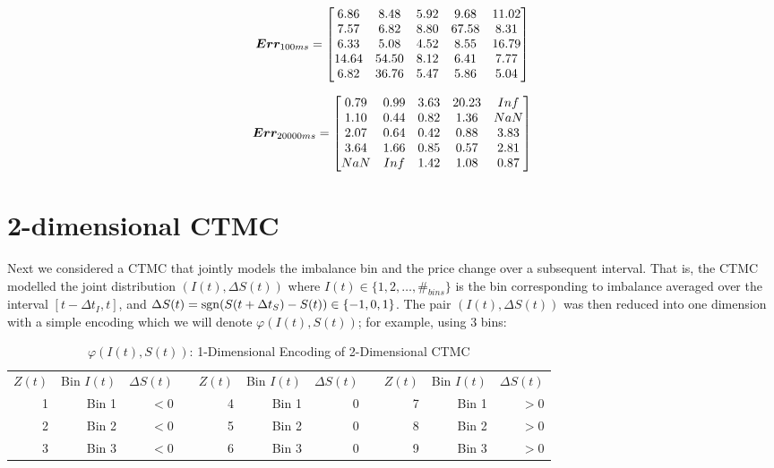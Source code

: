 $$\boldsymbol{Err}_{100ms} = \begin{bmatrix}
    6.86 &   8.48 &   5.92 &   9.68 &  11.02\\
    7.57 &   6.82 &   8.80 &  67.58 &   8.31\\
    6.33 &   5.08 &   4.52 &   8.55 &  16.79\\
   14.64 &  54.50 &   8.12 &   6.41 &   7.77\\
    6.82 &  36.76 &   5.47 &   5.86 &   5.04
\end{bmatrix}$$

$$\boldsymbol{Err}_{20000ms} = \begin{bmatrix}
    0.79 &   0.99 &   3.63 &  20.23 &    Inf\\
    1.10 &   0.44 &   0.82 &   1.36 &    NaN\\
    2.07 &   0.64 &   0.42 &   0.88 &   3.83\\
    3.64 &   1.66 &   0.85 &   0.57 &   2.81\\
     NaN &    Inf &   1.42 &   1.08 &   0.87
\end{bmatrix}$$

\section{2-dimensional CTMC}
Next we considered a CTMC that jointly models the imbalance bin and the price change over a subsequent interval. That is, the CTMC modelled the joint distribution $(I(t), \Delta S(t))$ where $I(t) \in \lbrace 1,2,\dots,\#_{bins} \rbrace$ is the bin corresponding to imbalance averaged over the interval $[t-\Delta t_I, t]$, and $\Delta S(t) = \operatorname{\mathrm{sgn}}(S(t+\Delta t_S)-S(t)) \in \lbrace -1, 0, 1 \rbrace$.  The pair $(I(t), \Delta S(t))$ was then reduced into one dimension with a simple encoding which we will denote $\varphi(I(t),S(t))$; for example, using 3 bins:

\begin{table}[H]
\centering
{}
\begin{tabular}{@{}rrrcrrrcrrr@{}}
\toprule
$Z(t)$ & Bin $I(t)$ & $\Delta S(t)$ & \phantom{abc} & $Z(t)$ & Bin $I(t)$ & $\Delta S(t)$ & \phantom{abc} & $Z(t)$ & Bin $I(t)$ & $\Delta S(t)$ \\
\cmidrule{1-3} \cmidrule{5-7} \cmidrule{9-11}
1 & Bin 1 & $<0$ && 4 & Bin 1 & $0$ && 7 & Bin 1 & $>0$ \\
2 & Bin 2 & $<0$ && 5 & Bin 2 & $0$ && 8 & Bin 2 & $>0$ \\
3 & Bin 3 & $<0$ && 6 & Bin 3 & $0$ && 9 & Bin 3 & $>0$ \\
\bottomrule
\end{tabular}
\caption{$\varphi(I(t),S(t))$: 1-Dimensional Encoding of 2-Dimensional CTMC}
\end{table}

